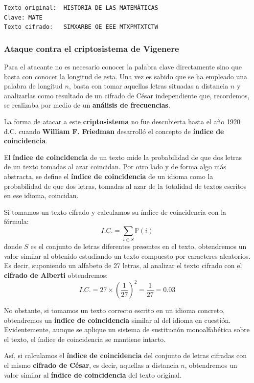 \documentclass[nochap]{apuntesURJC}
\begin{document}
\begin{verbatim}
Texto original:  HISTORIA DE LAS MATEMÁTICAS
Clave: MATE
Texto cifrado:   SIMXARBE OE EEE MTXPMTXTCTW
\end{verbatim}


\subsubsection{Ataque contra el criptosistema de Vigenere}
Para el atacante no es necesario conocer la palabra clave directamente sino que basta con conocer la longitud de esta. Una vez es sabido que se ha empleado una palabra de longitud $n$, basta con tomar aquellas letras situadas a distancia $n$ y analizarlas como resultado de un cifrado de César independiente que, recordemos, se realizaba por medio de un \textbf{análisis de frecuencias}.

La forma de atacar a este \textbf{criptosistema} no fue descubierta hasta el año 1920 d.C. cuando \textbf{William F. Friedman} desarrolló el concepto de \textbf{índice de coincidencia}.

El \textbf{índice de coincidencia} de un texto mide la probabilidad de que dos letras de un texto tomadas al azar coincidan. Por otro lado y de forma algo más abstracta, se define el \textbf{índice de coincidencia} de un idioma como la probabilidad de que dos letras, tomadas al azar de la totalidad de textos escritos en ese idioma, coincidan.

Si tomamos un texto cifrado y calculamos su índice de coincidencia con la fórmula:
\[I.C. = \sum_{i \in S}\mathbb{P}(i)\]
donde $S$ es el conjunto de letras diferentes presentes en el texto, obtendremos un valor similar al obtenido estudiando un texto compuesto por caracteres aleatorios. Es decir, suponiendo un alfabeto de 27 letras, al analizar el texto cifrado con el \textbf{cifrado de Alberti} obtendremos:
\[I.C. = 27 \times \left(\frac{1}{27}\right)^2 = \frac{1}{27} = 0.03\]

No obstante, si tomamos un texto correcto escrito en un idioma concreto, obtendremos un \textbf{índice de coincidencia} similar al del idioma en cuestión. Evidentemente, aunque se aplique un sistema de sustitución monoalfabética sobre el texto, el índice de coincidencia se mantiene intacto.

Así, si calculamos el \textbf{índice de coincidencia} del conjunto de letras cifradas con el mismo \textbf{cifrado de César}, es decir, aquellas a distancia $n$, obtendremos un valor similar al \textbf{índice de coincidencia} del texto original.
\end{document}
